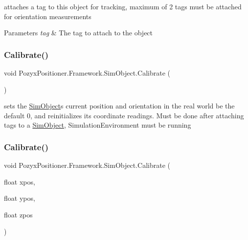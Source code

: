 attaches a tag to this object for tracking, maximum of 2 tags must be attached for orientation measurements 


\begin{DoxyParams}{Parameters}
{\em tag} & The tag to attach to the object \\
\hline
\end{DoxyParams}
\mbox{\label{class_pozyx_positioner_1_1_framework_1_1_sim_object_ae5a40c80792b6e84ae90cf31e2b5fc8f}} 
\subsubsection{\texorpdfstring{Calibrate()}{Calibrate()}\hspace{0.1cm}{\footnotesize\ttfamily [1/3]}}
{\footnotesize\ttfamily void Pozyx\+Positioner.\+Framework.\+Sim\+Object.\+Calibrate (\begin{DoxyParamCaption}{ }\end{DoxyParamCaption})}



sets the \hyperlink{class_pozyx_positioner_1_1_framework_1_1_sim_object}{Sim\+Object}\textquotesingle{}s current position and orientation in the real world be the default 0, and reinitializes its coordinate readings. Must be done after attaching tags to a \hyperlink{class_pozyx_positioner_1_1_framework_1_1_sim_object}{Sim\+Object}, Simulation\+Environment must be running 

\mbox{\label{class_pozyx_positioner_1_1_framework_1_1_sim_object_ad5e3a7c3290c1925d0e7d42a6e8b0111}} 
\subsubsection{\texorpdfstring{Calibrate()}{Calibrate()}\hspace{0.1cm}{\footnotesize\ttfamily [2/3]}}
{\footnotesize\ttfamily void Pozyx\+Positioner.\+Framework.\+Sim\+Object.\+Calibrate (\begin{DoxyParamCaption}\item[{float}]{xpos,  }\item[{float}]{ypos,  }\item[{float}]{zpos }\end{DoxyParamCaption})}



